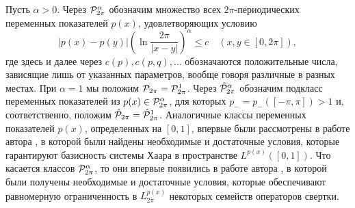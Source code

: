Пусть $\alpha>0$. Через ${\cal P}^\alpha_{2\pi}$ обозначим множество всех $2\pi$-периодических переменных показателей $p(x)$, удовлетворяющих условию
\begin{equation}\label{4.1}
    |p(x)-p(y)|\left(\ln\frac{2\pi}{|x-y|}\right)^\alpha\le c \quad (x,y\in [0,2\pi]),
\end{equation}
где здесь и далее через $c(p),c(p,q), \ldots$ обозначаются положительные числа, зависящие лишь от указанных параметров, вообще говоря различные в разных местах. При $\alpha=1$ мы положим  ${\cal P}_{2\pi}= {\cal P}^1_{2\pi}$. Через  $\hat{\cal P}^\alpha_{2\pi}$
обозначим подкласс переменных показателей из  $p(x)\in {\cal P}^\alpha_{2\pi}$, для которых $p_-=p_-([-\pi,\pi])>1$ и, соответственно, положим  $\hat{\cal P}_{2\pi}=\hat{\cal P}^1_{2\pi}$. Аналогичные классы переменных показателей
$p(x)$, определенных на $[0,1]$, впервые были рассмотрены в работе автора \cite{Shar1}, в которой были найдены необходимые и достаточные условия, которые гарантируют базисность системы Хаара в пространстве $L^{p(x)}([0,1])$. Что касается классов  ${\cal P}^\alpha_{2\pi}$,
то они впервые появились в работе автора \cite{Shar5}, в которой были получены необходимые и достаточные условия, которые обеспечивают
равномерную ограниченность в $L_{2\pi}^{p(x)}$ некоторых семейств операторов свертки.

